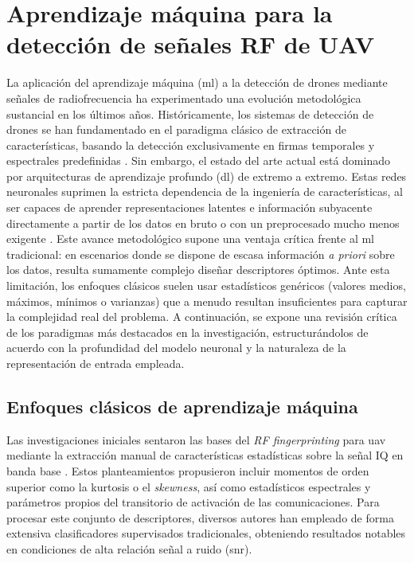 \section{Aprendizaje máquina para la detección de señales RF de UAV}
\label{sec:ml_deteccion_rf}

La aplicación del aprendizaje máquina (\gls{ml}) a la detección de drones mediante señales de radiofrecuencia ha experimentado una evolución metodológica sustancial en los últimos años. Históricamente, los sistemas de detección de drones se han fundamentado en el paradigma clásico de extracción de características, basando la detección exclusivamente en firmas temporales y espectrales predefinidas \cite{medaiyese_machine_2021, ezuma_micro-uav_2019}. Sin embargo, el estado del arte actual está dominado por arquitecturas de aprendizaje profundo (\gls{dl}) de extremo a extremo. Estas redes neuronales suprimen la estricta dependencia de la ingeniería de características, al ser capaces de aprender representaciones latentes e información subyacente directamente a partir de los datos en bruto o con un preprocesado mucho menos exigente \cite{allahham_dronerf_2019, zheng_deep_2025}. Este avance metodológico supone una ventaja crítica frente al \gls{ml} tradicional: en escenarios donde se dispone de escasa información \textit{a priori} sobre los datos, resulta sumamente complejo diseñar descriptores óptimos. Ante esta limitación, los enfoques clásicos suelen usar estadísticos genéricos (valores medios, máximos, mínimos o varianzas) que a menudo resultan insuficientes para capturar la complejidad real del problema. A continuación, se expone una revisión crítica de los paradigmas más destacados en la investigación, estructurándolos de acuerdo con la profundidad del modelo neuronal y la naturaleza de la representación de entrada empleada.

\subsection{Enfoques clásicos de aprendizaje máquina}
\label{subsec:ml_clasico}

Las investigaciones iniciales sentaron las bases del \textit{RF fingerprinting} para \gls{uav} mediante la extracción manual de características estadísticas sobre la señal IQ en banda base \cite{ezuma_micro-uav_2019, ezuma_detection_2020}. Estos planteamientos propusieron incluir momentos de orden superior como la kurtosis o el \textit{skewness}, así como estadísticos espectrales y parámetros propios del transitorio de activación de las comunicaciones. Para procesar este conjunto de descriptores, diversos autores han empleado de forma extensiva clasificadores supervisados tradicionales, obteniendo resultados notables en condiciones de alta relación señal a ruido (\gls{snr}).

